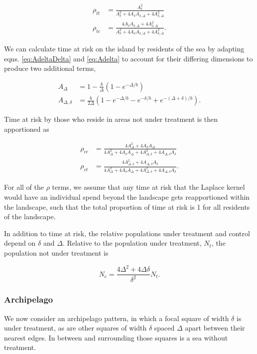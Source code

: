 \documentclass[11pt]{amsart}
\begin{document}
\begin{align}
\rho_{tt} &= \frac{A_{\delta}^2}{A_{\delta}^2+4 A_{\delta} A_{\delta,\Delta} + 4 A_{\delta,\Delta}^2} \\
\rho_{tc} &= \frac{4 A_{\delta} A_{\delta,\Delta} + 4 A_{\delta,\Delta}^2}{A_{\delta}^2+4 A_{\delta} A_{\delta,\Delta} + 4 A_{\delta,\Delta}^2} .
\end{align}

We can calculate time at risk on the island by residents of the sea by adapting eqns. \eqref{eq:AdeltaDelta} and \eqref{eq:Adelta} to account for their differing dimensions to produce two additional terms,

\begin{align}
A_{\Delta} &= 1 - \frac{b}{\Delta} \left( 1 - e^{-\Delta/b} \right) \\
A_{\Delta,\delta} &= \frac{b}{2\Delta} \left(1 - e^{-\Delta/b} - e^{-\delta/b} + e^{-(\Delta + \delta)/b} \right) .
\end{align}

\noindent Time at risk by those who reside in areas not under treatment is then apportioned as

\begin{align}
\rho_{cc} &= \frac{4 A_{\Delta}^2 + 4 A_{\delta}A_{\Delta}}{4 A_{\Delta}^2 + 4 A_{\delta}A_{\Delta}+4 A_{\Delta,\delta}^2 + 4 A_{\Delta,\delta} A_{\delta}} \\
\rho_{ct} &= \frac{4 A_{\Delta,\delta}^2 + 4 A_{\Delta,\delta} A_{\delta}}{4 A_{\Delta}^2 + 4 A_{\delta}A_{\Delta}+4 A_{\Delta,\delta}^2 + 4 A_{\Delta,\delta} A_{\delta}} .
\end{align}

\noindent For all of the $\rho$ terms, we assume that any time at risk that the Laplace kernel would have an individual spend beyond the landscape gets reapportioned within the landscape, such that the total proportion of time at risk is 1 for all residents of the landscape.

In addition to time at risk, the relative populations under treatment and control depend on $\delta$ and $\Delta$. Relative to the population under treatment, $N_t$, the population not under treatment is

\begin{equation}
N_c=\frac{4\Delta^2+4\Delta\delta}{\delta^2}N_t.
\end{equation}

\subsubsection{Archipelago}
We now consider an archipelago pattern, in which a focal square of width $\delta$ is under treatment, as are other squares of width $\delta$ spaced $\Delta$ apart between their nearest edges. In between and surrounding those squares is a sea without treatment.
\end{document}
